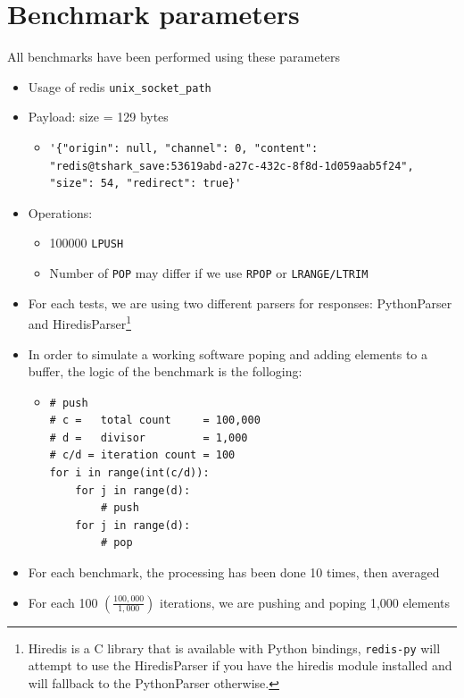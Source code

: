 \documentclass[a4paper, 11pt]{report}
\begin{document}
\section{Benchmark parameters}
All benchmarks have been performed using these parameters
\begin{itemize}
    \item Usage of redis \texttt{unix\_socket\_path}
    \item Payload: size = 129 bytes
        \begin{itemize}
            \item[]
                \begin{lstlisting}
'{"origin": null, "channel": 0, "content": "redis@tshark_save:53619abd-a27c-432c-8f8d-1d059aab5f24", "size": 54, "redirect": true}'
\end{lstlisting}
        \end{itemize}
    \item Operations:
        \begin{itemize}
            \item 100000 \texttt{LPUSH}
            \item Number of \texttt{POP} may differ if we use \texttt{RPOP} or \texttt{LRANGE/LTRIM}
        \end{itemize}
    \item For each tests, we are using two different parsers for responses: PythonParser and HiredisParser\footnote{Hiredis is a C library that is available with Python bindings, \texttt{redis-py} will attempt to use the HiredisParser if you have the hiredis module installed and will fallback to the PythonParser otherwise.}
    \item In order to simulate a working software poping and adding elements to a buffer, the logic of the benchmark is the folloging:
        \begin{itemize}
            \item[] \begin{lstlisting}
# push
# c =   total count     = 100,000
# d =   divisor         = 1,000
# c/d = iteration count = 100
for i in range(int(c/d)):
    for j in range(d):
        # push
    for j in range(d):
        # pop
\end{lstlisting}
        \end{itemize}
        \item For each benchmark, the processing has been done 10 times, then averaged
        \item For each 100 $\left(\frac{100,000}{1,000}\right)$ iterations, we are pushing and poping 1,000 elements
\end{itemize}
\end{document}

